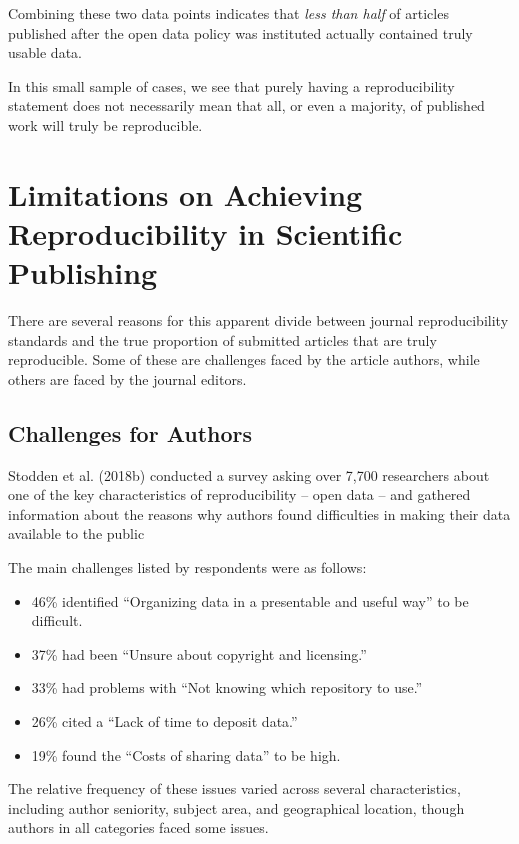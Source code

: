 \documentclass[12pt,twoside]{reedthesis}
\providecommand{\tightlist}{%
  \setlength{\itemsep}{0pt}\setlength{\parskip}{0pt}}
\begin{document}
Combining these two data points indicates that \emph{less than half} of articles published after the open data policy was instituted actually contained truly usable data.

In this small sample of cases, we see that purely having a reproducibility statement does not necessarily mean that all, or even a majority, of published work will truly be reproducible.

\hypertarget{limitations-on-achieving-reproducibility-in-scientific-publishing}{%
\section{Limitations on Achieving Reproducibility in Scientific Publishing}\label{limitations-on-achieving-reproducibility-in-scientific-publishing}}

There are several reasons for this apparent divide between journal reproducibility standards and the true proportion of submitted articles that are truly reproducible. Some of these are challenges faced by the article authors, while others are faced by the journal editors.

\hypertarget{challenges-for-authors}{%
\subsection{Challenges for Authors}\label{challenges-for-authors}}

Stodden et al. (2018b) conducted a survey asking over 7,700 researchers about one of the key characteristics of reproducibility -- open data -- and gathered information about the reasons why authors found difficulties in making their data available to the public

The main challenges listed by respondents were as follows:
\begin{itemize}
\tightlist
\item
  46\% identified ``Organizing data in a presentable and useful way'' to be difficult.
\item
  37\% had been ``Unsure about copyright and licensing.''
\item
  33\% had problems with ``Not knowing which repository to use.''
\item
  26\% cited a ``Lack of time to deposit data.''
\item
  19\% found the ``Costs of sharing data'' to be high.
\end{itemize}
The relative frequency of these issues varied across several characteristics, including author seniority, subject area, and geographical location, though authors in all categories faced some issues.
\end{document}
